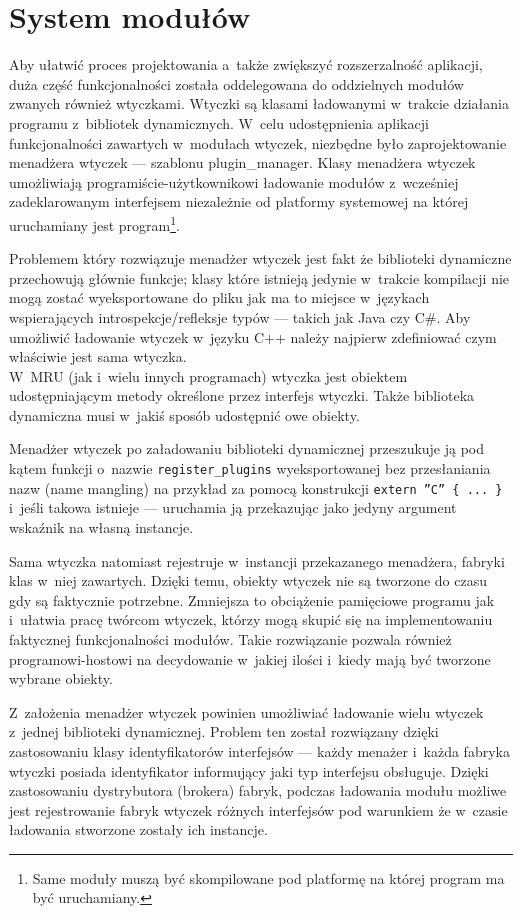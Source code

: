 \section{System modułów}
\label{system-modulow}
\par
Aby ułatwić proces projektowania a~także zwiększyć rozszerzalność aplikacji, duża część funkcjonalności została oddelegowana do oddzielnych modułów zwanych również wtyczkami.
Wtyczki są klasami ładowanymi w~trakcie działania programu z~bibliotek dynamicznych.
 W~celu udostępnienia aplikacji funkcjonalności zawartych w~modułach wtyczek, niezbędne było zaprojektowanie menadżera wtyczek --- szablonu plugin\_manager.
Klasy menadżera wtyczek umożliwiają programiście-użytkownikowi ładowanie modułów z~wcześniej zadeklarowanym interfejsem niezależnie od platformy systemowej na której uruchamiany jest program\footnote{Same moduły muszą być skompilowane pod platformę na której program ma być uruchamiany.}.

\par
Problemem który rozwiązuje menadżer wtyczek jest fakt że biblioteki dynamiczne przechowują głównie funkcje; klasy które istnieją jedynie w~trakcie kompilacji nie mogą zostać wyeksportowane do pliku jak ma to miejsce w~językach wspierających introspekcje/refleksje typów --- takich jak Java czy C\#.
Aby umożliwić ładowanie wtyczek w~języku C++ należy najpierw zdefiniować czym właściwie jest sama wtyczka.\\

 W~MRU (jak i~wielu innych programach) wtyczka jest obiektem udostępniającym metody określone przez interfejs wtyczki. Także biblioteka dynamiczna musi w~jakiś sposób udostępnić owe obiekty.

\par
Menadżer wtyczek po załadowaniu biblioteki dynamicznej przeszukuje ją pod kątem funkcji o~nazwie \texttt{register\_plugins} wyeksportowanej bez przesłaniania nazw (name mangling) na przykład za pomocą konstrukcji \texttt{extern ''C'' \{ ... \}} i~jeśli takowa istnieje --- uruchamia ją przekazując jako jedyny argument wskaźnik na własną instancje.
\par
Sama wtyczka natomiast rejestruje w~instancji przekazanego menadżera, fabryki klas w~niej zawartych.
Dzięki temu, obiekty wtyczek nie są tworzone do czasu gdy są faktycznie potrzebne. Zmniejsza to obciążenie pamięciowe programu jak i~ułatwia pracę twórcom wtyczek, którzy mogą skupić się na implementowaniu faktycznej funkcjonalności modułów. Takie rozwiązanie pozwala również programowi-hostowi na decydowanie w~jakiej ilości i~kiedy mają być tworzone wybrane obiekty.
\par
 Z~założenia menadżer wtyczek powinien umożliwiać ładowanie wielu wtyczek z~jednej biblioteki dynamicznej.
Problem ten został rozwiązany dzięki zastosowaniu klasy identyfikatorów interfejsów --- każdy menażer i~każda fabryka wtyczki posiada identyfikator informujący jaki typ interfejsu obsługuje. Dzięki zastosowaniu dystrybutora (brokera) fabryk, podczas ładowania modułu możliwe jest rejestrowanie fabryk wtyczek różnych interfejsów pod warunkiem że w~czasie ładowania stworzone zostały ich instancje.

